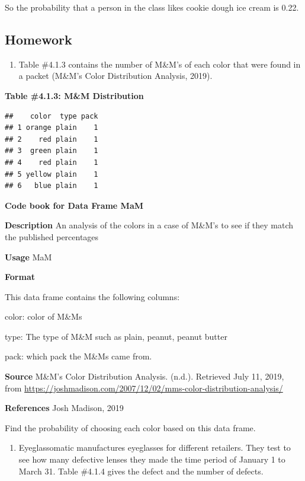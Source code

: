 \documentclass[
]{book}
\providecommand{\tightlist}{%
  \setlength{\itemsep}{0pt}\setlength{\parskip}{0pt}}
\begin{document}
So the probability that a person in the class likes cookie dough ice cream is 0.22.

\hypertarget{homework}{%
\subsection{Homework}\label{homework}}

\begin{enumerate}
\def\labelenumi{\arabic{enumi}.}
\tightlist
\item
  Table \#4.1.3 contains the number of M\&M's of each color that were found in a packet (M\&M's Color Distribution Analysis, 2019).
\end{enumerate}

\textbf{Table \#4.1.3: M\&M Distribution}

\begin{verbatim}
##    color  type pack
## 1 orange plain    1
## 2    red plain    1
## 3  green plain    1
## 4    red plain    1
## 5 yellow plain    1
## 6   blue plain    1
\end{verbatim}

\textbf{Code book for Data Frame MaM}

\textbf{Description}
An analysis of the colors in a case of M\&M's to see if they match the published percentages

\textbf{Usage}
MaM

\textbf{Format}

This data frame contains the following columns:

color: color of M\&Ms

type: The type of M\&M such as plain, peanut, peanut butter

pack: which pack the M\&Ms came from.

\textbf{Source}
M\&M's Color Distribution Analysis. (n.d.). Retrieved July 11, 2019, from \url{https://joshmadison.com/2007/12/02/mms-color-distribution-analysis/}

\textbf{References}
Josh Madison, 2019

Find the probability of choosing each color based on this data frame.

\begin{enumerate}
\def\labelenumi{\arabic{enumi}.}
\setcounter{enumi}{1}
\tightlist
\item
  Eyeglassomatic manufactures eyeglasses for different retailers. They test to see how many defective lenses they made the time period of January 1 to March 31. Table \#4.1.4 gives the defect and the number
  of defects.
\end{enumerate}
\end{document}
